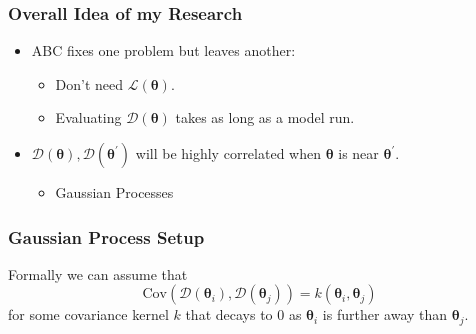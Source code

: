 \documentclass{beamer}
\begin{document}
\begin{frame}
    \frametitle{Overall Idea of my Research}
    \begin{itemize}
        \item ABC fixes one problem but leaves another:
              \begin{itemize}
                  \item Don't need $\mathcal{L}(\bm{\theta}).$
                  \item Evaluating $\mathcal{D}(\bm{\theta})$ takes as long as
                        a model run.
              \end{itemize}
        \item <2-> $\mathcal{D}(\bm{\theta}), \mathcal{D}(\bm{\theta}^\prime)$
              will be highly correlated when $\bm{\theta}$ is near
              $\bm{\theta}^\prime.$
              \begin{itemize}
                  \item Gaussian Processes
              \end{itemize}
    \end{itemize}
\end{frame}

\begin{frame}
    \frametitle{Gaussian Process Setup}

    Formally we can assume that
    $$\mathrm{Cov}(\mathcal{D}(\bm{\theta}_i), \mathcal{D}(\bm{\theta}_j))
        = k(\bm{\theta}_i, \bm{\theta}_j)$$ for some
    covariance kernel $k$ that decays to 0 as $\bm{\theta}_i$ is further away
    than $\bm{\theta}_j.$
\end{frame}

\end{document}
